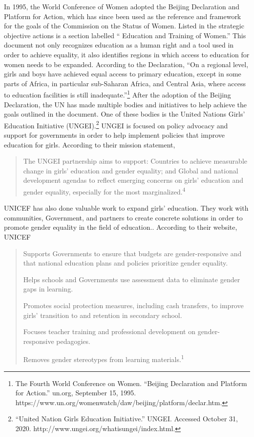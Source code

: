 \documentclass[10pt, letterpaper]{article}
\begin{document}
In 1995, the World Conference of Women adopted the Beijing Declaration
and Platform for Action, which has since been used as the reference and
framework for the goals of the Commission on the Status of Women. Listed
in the strategic objective actions is a section labelled `` Education
and Training of Women.'' This document not only recognizes education as
a human right and a tool used in order to achieve equality, it also
identifies regions in which access to education for women needs to be
expanded. According to the Declaration, ``On a regional level, girls and
boys have achieved equal access to primary education, except in some
parts of Africa, in particular sub-Saharan Africa, and Central Asia,
where access to education facilities is still inadequate.''\footnote{The
  Fourth World Conference on Women. ``Beijing Declaration and Platform
  for Action.'' un.org, September 15, 1995.
  https://www.un.org/womenwatch/daw/beijing/platform/declar.htm.} After
the adoption of the Beijing Declaration, the UN has made multiple bodies
and initiatives to help achieve the goals outlined in the document. One
of these bodies is the United Nations Girls' Education Initiative
(UNGEI).\footnote{``United Nation Girls Education Initiative.'' UNGEI.
  Accessed October 31, 2020.
  http://www.ungei.org/whatisungei/index.html.} UNGEI is focused on
policy advocacy and support for governments in order to help implement
policies that improve education for girls. According to their mission
statement, 

\begin{quote}
The UNGEI partnership aims to support: Countries to achieve measurable
change in girls' education and gender equality; and Global and national
development agendas to reflect emerging concerns on girls' education and
gender equality, especially for the most
marginalized.\textsuperscript{4}
\end{quote}

UNICEF has also done valuable work to expand girls' education. They work
with communities, Government, and partners to create concrete solutions
in order to promote gender equality in the field of education..
According to their website, UNICEF

\begin{quote}
Supports Governments to ensure that budgets are gender-responsive and
that national education plans and policies prioritize gender equality.


Helps schools and Governments use assessment data to eliminate gender
gaps in learning.


Promotes social protection measures, including cash transfers, to
improve girls' transition to and retention in secondary school.


Focuses teacher training and professional development on
gender-responsive pedagogies.

Removes gender stereotypes from learning materials.\textsuperscript{1}
\end{quote}
\end{document}
